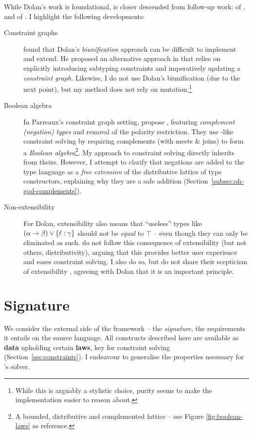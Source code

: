 While Dolan's work is foundational, \inference{} is closer descended from follow-up work: \simplesub{} of \textcite{simple-sub}, and \mlstruct{} of \textcite{mlstruct}. I highlight the following developments: \begin{description}
    \item[Constraint graphs] \textcite{simple-sub} found that Dolan's \emph{biunification} approach can be difficult to implement and extend. He proposed an alternative approach in \simplesub{} that relies on explicitly introducing subtyping constraints and imperatively updating a \emph{constraint graph}. Likewise, I do not use Dolan's biunification (due to the next point), but my method does not rely on mutation.\footnote{While this is arguably a stylistic choice, purity seems to make the implementation easier to reason about.}
    \item[Boolean algebra] In Parreaux's constraint graph setting, \textcite{mlstruct} propose \mlstruct{}, featuring \emph{complement (negation) types} and removal of the polarity restriction. They use \simplesub{}-like constraint solving by requiring complements (with meets \& joins) to form a \emph{Boolean algebra}\footnote{A bounded, distributive and complemented lattice -- see Figure \ref{fig:boolean-laws} as reference.}. My approach to constraint solving directly inherits from theirs. However, I attempt to clarify that negations are added to the type language as a \emph{free extension} of the distributive lattice of type constructors, explaining why they are a safe addition (Section~\ref{subsec:oh-god-complements}).
    \item[Non-extensibility] For Dolan, extensibility also means that \enquote{useless} types like $(\alpha \to \beta) \join \flrec{\ell : \gamma}$ should not be \emph{equal} to $\top$ \cite[Section~1.4.1]{dolan-thesis} -- even though they can only be eliminated as such. \textcite{mlstruct} do not follow this consequence of extensibility (but not others, \eg{} distributivity), arguing that this provides better user experience and eases constraint solving. I also do so, but do not share their scepticism of extensibility \cite{simple-sub}, agreeing with Dolan that it is an important principle. 
\end{description}

\section{Signature}
\label{sec:signature}

We consider the external side of the \inference{} framework -- the \emph{signature}, \ie{} the requirements it entails on the source language. 
All constructs described here are available as \textbf{data} upholding certain \textbf{laws}, key for constraint solving  (Section~\ref{sec:constraints}). I endeavour to generalise the properties necessary for \mlstruct{}'s solver.

